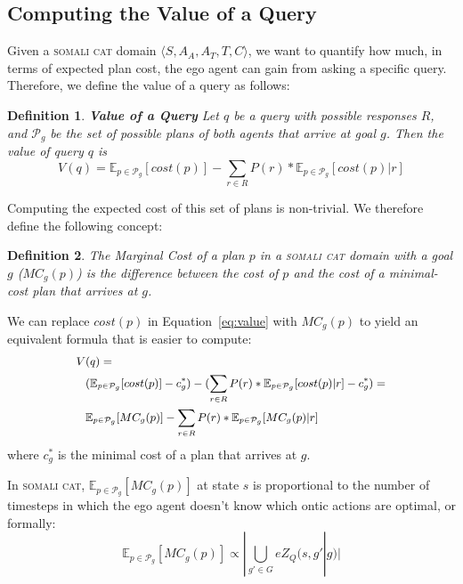 \documentclass[letterpaper]{article}
\newtheorem{definition}{Definition}
\begin{document}
\subsection{Computing the Value of a Query}

Given a \textsc{somali cat} domain $\langle S, A_A, A_T, T, C\rangle$, we want to
quantify how much, in terms of expected plan cost, the ego agent can gain from asking a specific query.
Therefore, we define the value of a query as follows:
\begin{definition}
\textbf{Value of a Query} Let $q$ be a query with possible responses $R$, and $\mathcal{P}_g$ be the set of possible plans of both agents that arrive at goal $g$. Then the value of query $q$ is
\begin{equation}
V(q) = \mathbb{E}_{p\in \mathcal{P}_g}[cost(p)] - \sum\limits_{r\in R}P(r)*\mathbb{E}_{p\in \mathcal{P}_g}[cost(p) | r]
\label{eq:value}
\end{equation}
\end{definition}

\noindent Computing the expected cost of this set of plans is non-trivial. We therefore define the following concept:
\begin{definition}
The \emph{Marginal Cost} of a plan $p$ in a \textsc{somali cat} domain with a goal $g$ ($MC_g(p)$) is the difference between the cost of $p$ and the cost of a minimal-cost plan that arrives at $g$.
\label{def:mc}
\end{definition}

\noindent We can replace $cost(p)$ in Equation~\ref{eq:value} with $MC_g(p)$ to yield an equivalent formula that is easier to compute:
\begin{equation}
\small
\begin{split}
V & (q) = \\
& (\mathbb{E}_{p\in \mathcal{P}_g}[cost(p)] - c^*_g) - (\sum\limits_{r\in R}P(r)*\mathbb{E}_{p\in \mathcal{P}_g}[cost(p) | r] - c^*_g) =\\ &
\mathbb{E}_{p\in \mathcal{P}_g}[MC_g(p)] - \sum\limits_{r\in R}P(r)*\mathbb{E}_{p\in \mathcal{P}_g}[MC_g(p) | r]
\end{split}
\label{eq:v_q}
\end{equation}
where $c^*_g$ is the minimal cost of a plan that arrives at $g$.

In \textsc{somali cat},
$\mathbb{E}_{p\in\mathcal{P}_g}[MC_g(p)]$ at state $s$ is proportional to the number of timesteps in which the ego agent doesn't know which ontic actions are optimal, or formally:
\begin{equation*}
\mathbb{E}_{p\in \mathcal{P}_g}[MC_g(p)]\propto |\bigcup\limits_{g'\in G}eZ_Q(s, g' | g)|
\end{equation*}
\end{document}
